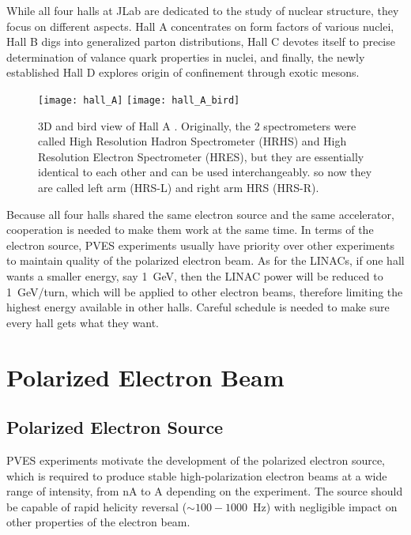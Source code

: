 While all four halls at JLab are dedicated to the study of nuclear structure, they
focus on different aspects. Hall A concentrates on form factors of various nuclei, 
Hall B digs into generalized parton distributions, Hall C devotes itself to precise
determination of valance quark properties in nuclei, and finally, the newly 
established Hall D explores origin of confinement through exotic mesons.
\begin{figure}[!h]
    \centering
    \texttt{[image: hall\_A]}
    \texttt{[image: hall\_A\_bird]}
    \caption{3D and bird view of Hall A \cite{halla_manual}. Originally, the 2 spectrometers
    were called High Resolution Hadron Spectrometer (HRHS) and High Resolution Electron
    Spectrometer (HRES), but they are essentially identical to each other and
    can be used interchangeably.
    so now they are called left arm (HRS-L) and right arm HRS (HRS-R).
    }
\end{figure}

Because all four halls shared the same electron source and the same accelerator, 
cooperation is needed to make them work at the same time. In terms of the electron
source, PVES experiments usually have priority over other experiments to maintain 
quality of the polarized electron beam. As for the LINACs, if one hall wants
a smaller energy, say 1~GeV, then the LINAC power will be reduced to 1~GeV/turn,
which will be applied to other electron beams, therefore limiting the 
highest energy available in other halls. Careful schedule is needed to make sure
every hall gets what they want.
\section{Polarized Electron Beam}

\subsection{Polarized Electron Source}
PVES experiments motivate the development of the polarized electron source, which 
is required to produce stable high-polarization electron beams at a wide range of intensity, 
from nA to A depending on the experiment. The source should be capable of rapid helicity
reversal ($\sim 100-1000$~Hz) with negligible impact on other properties of the electron beam.

